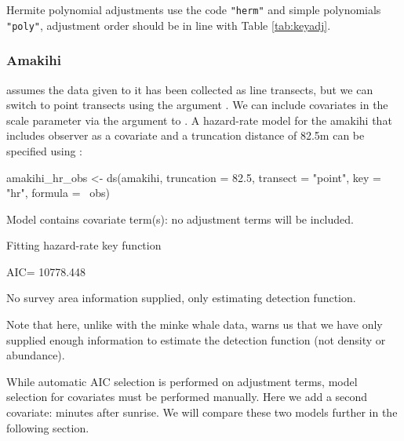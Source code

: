 \documentclass[article,shortnames]{jss}
\begin{document}
Hermite polynomial adjustments use the code \texttt{"herm"} and simple
polynomials \texttt{"poly"}, adjustment order should be in line with
Table \ref{tab:keyadj}.

\subsubsection{Amakihi}\label{amakihi-1}

 assumes the data given to it has been collected as line
transects, but we can switch to point transects using the argument
. We can include covariates in the scale
parameter via the  argument to . A
hazard-rate model for the amakihi that includes observer as a covariate
and a truncation distance of 82.5m \citep{Marques:2007ey} can be
specified using :

\begin{CodeChunk}
\begin{CodeInput}
amakihi_hr_obs <- ds(amakihi, truncation = 82.5, transect = "point",
                     key = "hr", formula = ~obs)
\end{CodeInput}
\begin{CodeOutput}
Model contains covariate term(s): no adjustment terms will be included.
\end{CodeOutput}
\begin{CodeOutput}
Fitting hazard-rate key function
\end{CodeOutput}
\begin{CodeOutput}
AIC= 10778.448
\end{CodeOutput}
\begin{CodeOutput}
No survey area information supplied, only estimating detection function.
\end{CodeOutput}
\end{CodeChunk}

Note that here, unlike with the minke whale data,  warns us
that we have only supplied enough information to estimate the detection
function (not density or abundance).

While automatic AIC selection is performed on adjustment terms, model
selection for covariates must be performed manually. Here we add a
second covariate: minutes after sunrise. We will compare these two
models further in the following section.
\end{document}

